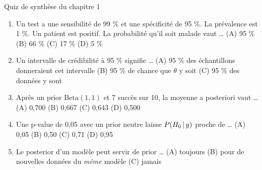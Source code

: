 \begin{frame}{Quiz de synthèse du chapitre 1}
\begin{qbox}
\begin{enumerate}
  \item Un test a une sensibilité de 99 \% et une spécificité de 95 \%.
        La prévalence est 1 \%. Un patient est positif.
        La probabilité qu'il soit malade vaut \dots
        (A) 95 \% \quad (B) 66 \% \quad (C) 17 \% \quad (D) 5 \%
  \item Un intervalle de crédibilité à 95 \% signifie \dots
        (A) 95 \% des échantillons donneraient cet intervalle \quad
        (B) 95 \% de chance que $\theta$ y soit \quad
        (C) 95 \% des données y sont
  \item Après un prior $\mathrm{Beta}(1,1)$ et 7 succès sur 10, la moyenne
        a posteriori vaut \dots
        (A) 0,700 \quad (B) 0,667 \quad (C) 0,643 \quad (D) 0,500
  \item Une p-value de 0,05 avec un prior neutre laisse
        $P(H_0 \,\vert\, y)$ proche de \dots
        (A) 0,05 \quad (B) 0,50 \quad (C) 0,71 \quad (D) 0,95
  \item Le posterior d'un modèle peut servir de prior \dots
        (A) toujours \quad (B) pour de nouvelles données du \emph{même} modèle
        \quad (C) jamais
\end{enumerate}
\end{qbox}
\end{frame}

